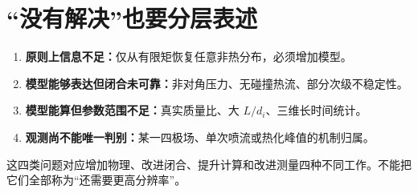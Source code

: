\section{“没有解决”也要分层表述}
\begin{enumerate}
\item \textbf{原则上信息不足：}仅从有限矩恢复任意非热分布，必须增加模型。
\item \textbf{模型能够表达但闭合未可靠：}非对角压力、无碰撞热流、部分次级不稳定性。
\item \textbf{模型能算但参数范围不足：}真实质量比、大 $L/d_i$、三维长时间统计。
\item \textbf{观测尚不能唯一判别：}某一四极场、单次喷流或热化峰值的机制归属。
\end{enumerate}
这四类问题对应增加物理、改进闭合、提升计算和改进测量四种不同工作。不能把它们全部称为“还需要更高分辨率”。
